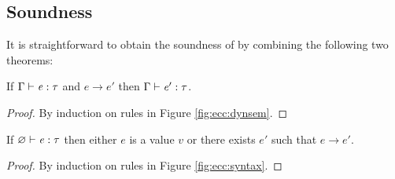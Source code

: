 \subsection{Soundness}

It is straightforward to obtain the soundness of \expcc by combining the following two theorems:

\begin{thm}
  If $\Gamma  \vdash  \mathit{e}  :  \tau$ and $e  \longrightarrow  e'$ then $\Gamma  \vdash  \mathit{e'}  :  \tau$.
\end{thm}

\begin{proof}
	By induction on rules in Figure \ref{fig:ecc:dynsem}.
\end{proof}

\begin{thm}[Progress]
  If $\varnothing  \vdash  \mathit{e}  :  \tau$ then either $e$ is a value $v$ or there exists
  $e'$ such that $e  \longrightarrow  e'$.
\end{thm}

\begin{proof}
	By induction on rules in Figure \ref{fig:ecc:syntax}.
\end{proof}
